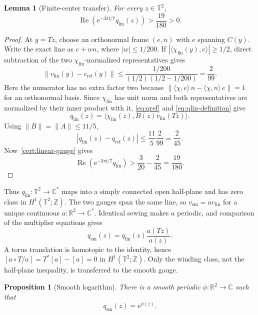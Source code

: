 \documentclass[11pt,reqno]{amsart}
\numberwithin{equation}{section}
\newtheorem{proposition}[theorem]{Proposition}
\newtheorem{lemma}[theorem]{Lemma}
\theoremstyle{definition}
\newcommand{\R}{\mathbb R}
\newcommand{\C}{\mathbb C}
\newcommand{\Z}{\mathbb Z}
\newcommand{\T}{\mathbb T}
\newcommand{\ip}[2]{\langle #1,#2\rangle}
\newcommand{\norm}[1]{\lVert #1\rVert}
\newcommand{\e}{\mathrm e}
\newcommand{\ii}{\mathrm i}
\begin{document}
\begin{lemma}[Finite-center transfer]\label{lem:finite-center-transfer}
For every $z\in\T^2$,
\begin{equation}\label{eq:exact-half-plane}
 \operatorname{Re}\!\left(
 \e^{-3\pi\ii/7}q_{\mathrm{lin}}(z)\right)>
 \frac{19}{180}>0.
\end{equation}
\end{lemma}

\begin{proof}
At $y=Tz$, choose an orthonormal frame $(e,n)$ with $e$ spanning $C(y)$.
Write the exact line as $e+wn$, where $|w|\le1/200$.  If
$|\ip{\chi_{\mathrm{lin}}(y)}e|\ge1/2$, direct subtraction of the two
$\chi_{\mathrm{lin}}$-normalized representatives gives
\begin{equation}\label{eq:gauge-perturbation}
 \norm{v_{\mathrm{lin}}(y)-c_{\mathrm{ref}}(y)}
 \le\frac{1/200}{(1/2)(1/2-1/200)}=\frac2{99}.
\end{equation}
Here the numerator has no extra factor two because
$\norm{\ip{\chi}e\,n-\ip{\chi}n\,e}=1$ for an orthonormal basis.
Since $\chi_{\mathrm{lin}}$ has unit norm and both representatives are
normalized by their inner product with it, \eqref{eq:qref} and
\eqref{eq:qlin-definition} give
\[
 q_{\mathrm{lin}}(z)=
 \ip{\chi_{\mathrm{lin}}(z)}
 {B(z)v_{\mathrm{lin}}(Tz)}.
\]
Using $\norm B=\norm A\le11/5$,
\[
 |q_{\mathrm{lin}}(z)-q_{\mathrm{ref}}(z)|
 \le\frac{11}{5}\frac2{99}=\frac2{45}.
\]
Now~\ref{cert:linear-gauge} gives
\[
 \operatorname{Re}(\e^{-3\pi\ii/7}q_{\mathrm{lin}})
 >\frac3{20}-\frac2{45}=\frac{19}{180}.
\]
\end{proof}

Thus $q_{\mathrm{lin}}:\T^2\to\C^*$ maps into a simply connected open
half-plane and has zero class in $H^1(\T^2;\Z)$.  The two gauges span the
same line, so $v_{\mathrm{sm}}=a v_{\mathrm{lin}}$ for a unique continuous
$a:\R^2\to\C^*$.  Identical sewing makes $a$ periodic, and comparison of the
multiplier equations gives
\begin{equation}\label{eq:gauge-multiplier-transfer}
 q_{\mathrm{sm}}(z)=q_{\mathrm{lin}}(z)\frac{a(Tz)}{a(z)}.
\end{equation}
A torus translation is homotopic to the identity, hence
$[a\circ T/a]=T^*[a]-[a]=0$ in $H^1(\T^2;\Z)$.  Only the winding class,
not the half-plane inequality, is transferred to the smooth gauge.

\begin{proposition}[Smooth logarithm]\label{prop:smooth-log}
There is a smooth periodic $\phi:\R^2\to\C$ such that
\begin{equation}\label{eq:log-q}
 q_{\mathrm{sm}}(z)=\e^{\phi(z)}.
\end{equation}
\end{proposition}
\end{document}
